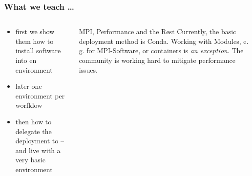 \begin{frame}
  \frametitle{What we teach \ldots}
  \begin{columns}
  	\begin{column}{0.5\textwidth}
  		\begin{itemize}[<+->]
  			\item first we show them how to install software into en environment
  			\item later one environment per worfklow
  			\item then how to delegate the deployment to \Snakemake -- and live with a very basic environment
  		\end{itemize}
  	\end{column}
  	\begin{column}{0.5\textwidth}
  		\pause
  		\begin{hint}{MPI, Performance and the Rest}
  			Currently, the basic deployment method is Conda. Working with Modules, e.\,g. for MPI-Software, or containers is \emph{an exception}.\newline
  			The community is working hard to mitigate performance issues.
  		\end{hint}
  	\end{column}
  \end{columns}
\end{frame}

